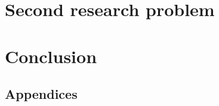 \documentclass[UKenglish, final]{uiomasterbeta}  %
\begin{document}
\part{Second research problem}                     %
\label{p2}
\begin{refsection}
  
\end{refsection}

\part{Conclusion}
\label{conc}
\begin{refsection}
  
\end{refsection}

\backmatter{}
    \appendix %
    \begin{refsection}
    \part*{Appendices}
    
    
\end{refsection}
\end{document}
